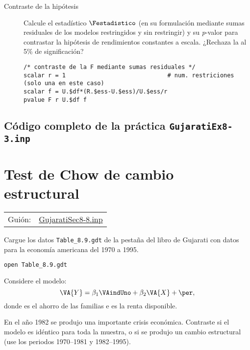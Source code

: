 \documentclass[11pt]{article}
\begin{document}
\begin{description}
\item[{Contraste de la hipótesis}] Calcule el estadístico \(\Festadistico\)
(en su formulación mediante sumas residuales de los modelos
restringidos y sin restringir) y su \emph{p}-valor para contrastar la
hipótesis de rendimientos constantes a escala. ¿Rechaza la \Hnula al
5\% de significación?
\begin{verbatim}
/* contraste de la F mediante sumas residuales */
scalar r = 1                             # num. restriciones (solo una en este caso)
scalar f = U.$df*(R.$ess-U.$ess)/U.$ess/r
pvalue F r U.$df f
\end{verbatim}
\end{description}

\clearpage
\vspace{10pt}
\noindent
\subsection{Código completo de la práctica \texttt{GujaratiEx8-3.inp}}
\label{sec:org3870d9b}
\vspace{10pt}

\clearpage


\section{Test de Chow de cambio estructural}
\label{sec:org4b34ea2}
\begin{center}
\begin{tabular}{ll}
Guión: & \href{https://github.com/mbujosab/Ectr/tree/master/Practicas/Gretl/scripts/GujaratiSec8-8.inp}{GujaratiSec8-8.inp}\\[0pt]
\end{tabular}
\end{center}

Cargue los datos \texttt{Table\_8.9.gdt} de la pestaña del libro de Gujarati
con datos para la economía americana del 1970 a 1995.
\begin{verbatim}
open Table_8.9.gdt
\end{verbatim}

Considere el modelo:
\begin{displaymath}
  \VA{Y} = \beta_1\VAindUno + \beta_2\VA{X} + \per,
\end{displaymath}
donde  es el ahorro de las familias e  es la renta
disponible.

En el año 1982 se produjo una importante crisis económica. Contraste
si el modelo es idéntico para toda la muestra, o si se produjo un
cambio estructural (use los periodos 1970--1981 y 1982--1995).
\end{document}

